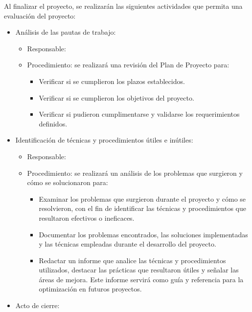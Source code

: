 Al finalizar el proyecto, se realizarán las siguientes actividades que permita
una evaluación del proyecto:

\begin{itemize}
	\item Análisis de las pautas de trabajo:
	      \begin{itemize}
		      \item Responsable: \authorname 
		      \item Procedimiento: se realizará una revisión del Plan de Proyecto para:
		            \begin{itemize}
			            \item Verificar si se cumplieron los plazos establecidos.
			            \item Verificar si se cumplieron los objetivos del proyecto.
			            \item Verificar si pudieron cumplimentarse y validarse los requerimientos definidos.
		            \end{itemize}
	      \end{itemize}
	\item Identificación de técnicas y procedimientos útiles e inútiles:
	      \begin{itemize}
		      \item Responsable: \authorname
		      \item Procedimiento: se realizará un análisis de los problemas que surgieron y cómo
		            se solucionaron para:
		            \begin{itemize}
			            \item Examinar los problemas que surgieron durante el proyecto y cómo se resolvieron,
			                  con el fin de identificar las técnicas y procedimientos que resultaron
			                  efectivos o ineficaces.
			            \item Documentar los problemas encontrados, las soluciones implementadas y las
			                  técnicas empleadas durante el desarrollo del proyecto.
			            \item Redactar un informe que analice las técnicas y procedimientos utilizados,
			                  destacar las prácticas que resultaron útiles y señalar las áreas de mejora.
			                  Este informe servirá como guía y referencia para la optimización en futuros
			                  proyectos.
		            \end{itemize}
	      \end{itemize}
	\item Acto de cierre:

\end{itemize}
